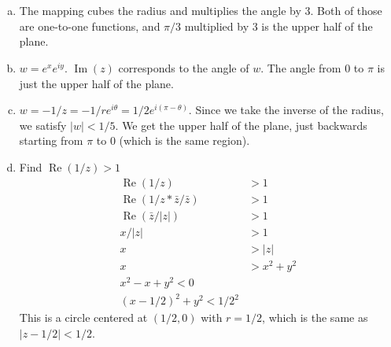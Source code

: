 \documentclass[12pt]{article}
\begin{document}
\section{}
\begin{enumerate}[(a)]
	\item The mapping cubes the radius and multiplies the angle by 3. Both of those are one-to-one functions, and $ \pi/3 $ multiplied by 3 is the upper half of the plane.
	
	\item $ w = e^x e^{iy} $. $ \operatorname{Im}(z) $ corresponds to the angle of $ w $. The angle from $ 0 $ to $ \pi $ is just the upper half of the plane.
	
	\item $ w = -1/z = -1/r e^{i\theta} = 1/2 e^{i(\pi-\theta)}$. Since we take the inverse of the radius, we satisfy $ |w| < 1/5 $. We get the upper half of the plane, just backwards starting from $ \pi $ to $ 0 $ (which is the same region).
	
	\item Find $ \operatorname{Re}(1/z) > 1 $
	\begin{align*}
		\operatorname{Re}(1/z) &> 1\\
		\operatorname{Re}(1/z * \bar{z}/\bar{z}) &> 1\\
		\operatorname{Re}(\bar{z}/|z|) &> 1\\
		x/|z| &> 1\\
		x &> |z|\\
		x &> x^2 + y^2\\
		x^2 - x + y^2 < 0\\
		(x-1/2)^2 + y^2 < 1/2^2
	\end{align*}
	This is a circle centered at $ (1/2, 0) $ with $ r = 1/2 $, which is the same as $ |z-1/2| < 1/2 $.
\end{enumerate}
\end{document}
